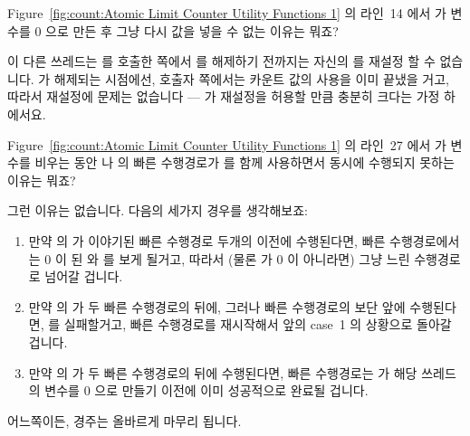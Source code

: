 \begin{enumerate}
\QuickQ{}
	Figure~\ref{fig:count:Atomic Limit Counter Utility Functions 1} 의
	라인~14 에서  가  변수를 0 으로
	만든 후 그냥 다시 값을 넣을 수 없는 이유는 뭐죠?

\QuickA{}
	이 다른 쓰레드는  를 호출한 쪽에서
	 를 해제하기 전까지는 자신의  를 재설정
	할 수 없습니다.
	 가 해제되는 시점에선,  호출자
	쪽에서는 카운트 값의 사용을 이미 끝냈을 거고, 따라서 재설정에 문제는
	없습니다 ---  가 재설정을 허용할 만큼 충분히 크다는
	가정 하에서요.

\QuickQ{}
	Figure~\ref{fig:count:Atomic Limit Counter Utility Functions 1} 의
	라인~27 에서  가  변수를 비우는
	동안  나  의 빠른 수행경로가
	 를 함께 사용하면서 동시에 수행되지 못하는 이유는 뭐죠?

\QuickA{}
	그런 이유는 없습니다.
	다음의 세가지 경우를 생각해보죠:
	\begin{enumerate}
	\item	만약  의  가 이야기된
		빠른 수행경로 두개의  이전에 수행된다면,
		빠른 수행경로에서는 0 이 된  와  를
		보게 될거고, 따라서 (물론  가 0 이 아니라면) 그냥
		느린 수행경로로 넘어갈 겁니다.
	\item	만약  의  가 두 빠른
		수행경로의  뒤에, 그러나 빠른 수행경로의
		 보단 앞에 수행된다면,
		 를 실패할거고, 빠른 수행경로를 재시작해서
		앞의 case~1 의 상황으로 돌아갈 겁니다.
	\item	만약  의  가 두 빠른
		수행경로의  뒤에 수행된다면, 빠른
		수행경로는  가 해당 쓰레드의
		 변수를 0 으로 만들기 이전에 이미 성공적으로
		완료될 겁니다.
	\end{enumerate}
	어느쪽이든, 경주는 올바르게 마무리 됩니다.
	\iffalse


\end{enumerate}
